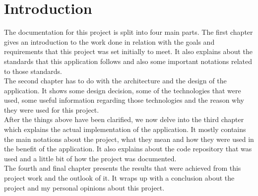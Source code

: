 \chapter{Introduction}
The documentation for this project is split into four main parts. 
The first chapter gives an introduction to the work done in relation with the goals and requirements that this project was set initially to meet. It also explains about the standards that this application follows and also some important notations related to those standards.\\
\newline
The second chapter has to do with the architecture and the design of the application. It shows some design decision, some of the technologies that were used, some useful information regarding those technologies and the reason why they were used for this project.\\
\newline
After the things above have been clarified, we now delve into the third chapter which explains the actual implementation of the application. It mostly contains the main notations about the project, what they mean and how they were used in the benefit of the application. It also explains about the code repository that was used and a little bit of how the project was documented.\\
\newline
The fourth and final chapter presents the results that were achieved from this project work and the outlook of it. It wraps up with a conclusion about the project and my personal opinions about this project.
\newpage
